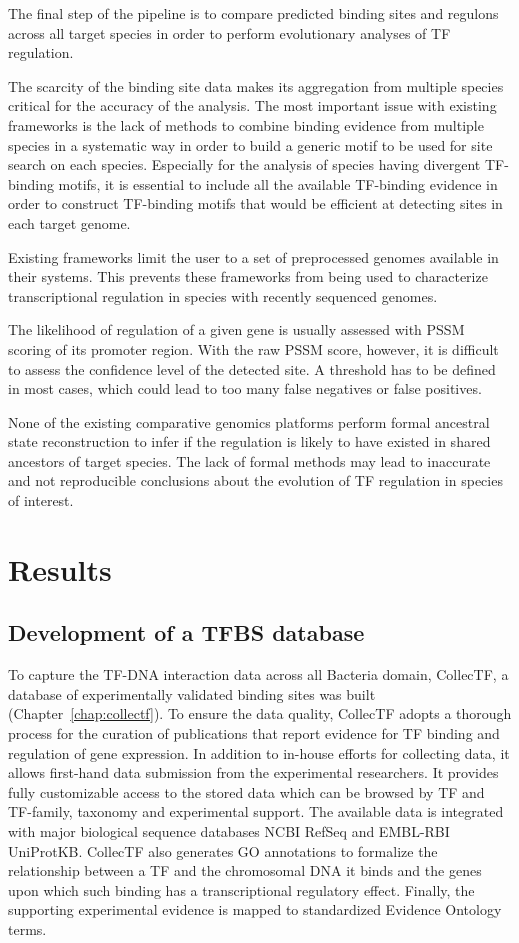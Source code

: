 The final step of the pipeline is to compare predicted binding sites and
regulons across all target species in order to perform evolutionary analyses of
TF regulation.

The scarcity of the binding site data makes its aggregation from multiple
species critical for the accuracy of the analysis. The most important issue
with existing frameworks is the lack of methods to combine binding evidence
from multiple species in a systematic way in order to build a generic motif to
be used for site search on each species. Especially for the analysis of species
having divergent TF-binding motifs, it is essential to include all the
available TF-binding evidence in order to construct TF-binding motifs that
would be efficient at detecting sites in each target genome.

Existing frameworks limit the user to a set of preprocessed genomes available
in their systems. This prevents these frameworks from being used to
characterize transcriptional regulation in species with recently sequenced
genomes.

The likelihood of regulation of a given gene is usually assessed with PSSM
scoring of its promoter region. With the raw PSSM score, however, it is
difficult to assess the confidence level of the detected site. A threshold has
to be defined in most cases, which could lead to too many false negatives or
false positives.

None of the existing comparative genomics platforms perform formal ancestral
state reconstruction to infer if the regulation is likely to have existed in
shared ancestors of target species. The lack of formal methods may lead to
inaccurate and not reproducible conclusions about the evolution of TF
regulation in species of interest.

\section{Results}

\subsection{Development of a TFBS database}

To capture the TF-DNA interaction data across all Bacteria domain, CollecTF, a
database of experimentally validated binding sites was built
(Chapter~\ref{chap:collectf}). To ensure the data quality, CollecTF adopts a
thorough process for the curation of publications that report evidence for TF
binding and regulation of gene expression. In addition to in-house efforts for
collecting data, it allows first-hand data submission from the experimental
researchers. It provides fully customizable access to the stored data which can
be browsed by TF and TF-family, taxonomy and experimental support. The
available data is integrated with major biological sequence databases NCBI
RefSeq and EMBL-RBI UniProtKB\-. CollecTF also generates GO annotations to
formalize the relationship between a TF and the chromosomal DNA it binds and
the genes upon which such binding has a transcriptional regulatory
effect. Finally, the supporting experimental evidence is mapped to standardized
Evidence Ontology terms.

